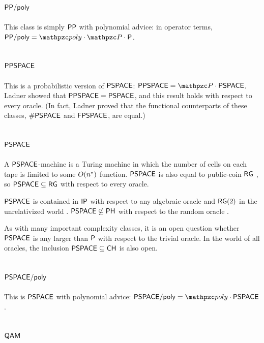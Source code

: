 \subsection{$\mathsf{PP}/\mathsf{poly}$}

This class is simply $\mathsf{PP}$ with polynomial advice: in operator terms, 
$\msf{PP}/\poly=\cpoly\cdot\cP\cdot\sP$.

\subsection{$\mathsf{PPSPACE}$} \label{ppspace-subsection}

This is a probabilistic version of $\mathsf{PSPACE}$: 
$\msf{PPSPACE}=\cP\cdot\msf{PSPACE}$. Ladner \cite{ladner1989polynomial} showed 
that $\mathsf{PPSPACE}=\mathsf{PSPACE}$, and this result holds with respect to every 
oracle. (In fact, Ladner proved that the functional counterparts of these classes,
$\#\mathsf{PSPACE}$ and $\mathsf{FPSPACE}$, are equal.)

\subsection{$\mathsf{PSPACE}$}

A $\mathsf{PSPACE}$-machine is a Turing machine in which the number of cells on 
each tape is limited to some $O(n^*)$ function. $\mathsf{PSPACE}$ is also equal 
to public-coin $\mathsf{RG}$ \cite{papadimitriou1985games}, so 
$\mathsf{PSPACE}\subseteq\mathsf{RG}$ with respect to every oracle.

$\mathsf{PSPACE}$ is contained in $\mathsf{IP}$ with respect to any algebraic oracle 
\cite{aaronson2009algebrization} and $\mathsf{RG}(2)$ in the unrelativized world 
\cite{feige1997making}. $\mathsf{PSPACE}\not\subseteq\mathsf{PH}$ with respect to the 
random oracle \cite{Cai:1986:POR:12130.12133}.

As with many important complexity classes, it is an open question whether 
$\mathsf{PSPACE}$ is any larger than $\mathsf{P}$ with respect to the trivial oracle. In 
the world of all oracles, the inclusion $\mathsf{PSPACE}\subseteq\mathsf{CH}$ is also 
open.

\subsection{$\mathsf{PSPACE}/\mathsf{poly}$}

This is $\mathsf{PSPACE}$ with polynomial advice: 
$\msf{PSPACE}/\poly=\cpoly\cdot\msf{PSPACE}$.

\subsection{$\mathsf{QAM}$}

